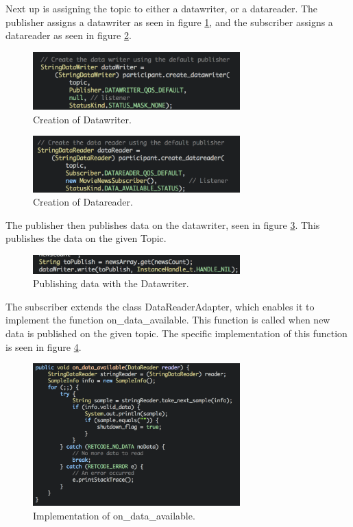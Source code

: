 Next up is assigning the topic to either a datawriter, or a datareader. The publisher assigns a datawriter as seen in figure \ref{CreateDataWriter}, and the subscriber assigns a datareader as seen in figure \ref{CreateDataReader}.

\begin{figure}[ht!]
\centering
\includegraphics[width=80mm]{img/CreateDataWriter.png}
\caption{Creation of Datawriter.}
\label{CreateDataWriter}
\end{figure}

\begin{figure}[ht!]
\centering
\includegraphics[width=80mm]{img/CreateDataReader.png}
\caption{Creation of Datareader.}
\label{CreateDataReader}
\end{figure}

The publisher then publishes data on the datawriter, seen in figure \ref{DataWriterWrite}. This publishes the data on the given Topic.

\begin{figure}[ht!]
\centering
\includegraphics[width=80mm]{img/DataWriterWrite.png}
\caption{Publishing data with the Datawriter.}
\label{DataWriterWrite}
\end{figure}

The subscriber extends the class DataReaderAdapter, which enables it to implement the function on\_data\_available. This function is called when new data is published on the given topic. The specific implementation of this function is seen in figure \ref{OnDataAvailable}.

\begin{figure}[ht!]
\centering
\includegraphics[width=80mm]{img/OnDataAvailable.png}
\caption{Implementation of on\_data\_available.}
\label{OnDataAvailable}
\end{figure}

